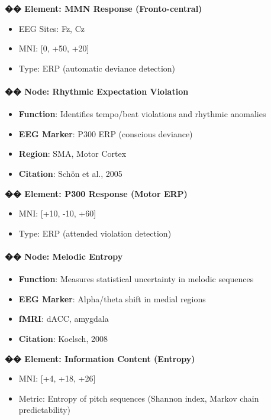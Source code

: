 \documentclass[10pt]{article}
\begin{document}
\textbf{�� Element: MMN Response (Fronto-central)}

\begin{itemize}
    \item EEG Sites: Fz, Cz
    \item MNI: [0, +50, +20]
    \item Type: ERP (automatic deviance detection)
\end{itemize}

\paragraph{�� Node: Rhythmic Expectation Violation}

\begin{itemize}
    \item \textbf{Function}: Identifies tempo/beat violations and rhythmic anomalies
    \item \textbf{EEG Marker}: P300 ERP (conscious deviance)
    \item \textbf{Region}: SMA, Motor Cortex
    \item \textbf{Citation}: Schön et al., 2005
\end{itemize}

\textbf{�� Element: P300 Response (Motor ERP)}

\begin{itemize}
    \item MNI: [+10, -10, +60]
    \item Type: ERP (attended violation detection)
\end{itemize}

\paragraph{�� Node: Melodic Entropy}

\begin{itemize}
    \item \textbf{Function}: Measures statistical uncertainty in melodic sequences
    \item \textbf{EEG Marker}: Alpha/theta shift in medial regions
    \item \textbf{fMRI}: dACC, amygdala
    \item \textbf{Citation}: Koelsch, 2008
\end{itemize}

\textbf{�� Element: Information Content (Entropy)}

\begin{itemize}
    \item MNI: [+4, +18, +26]
    \item Metric: Entropy of pitch sequences (Shannon index, Markov chain predictability)
\end{itemize}
\end{document}
